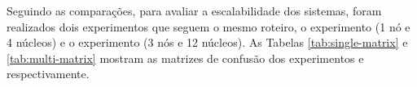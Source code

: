 




Seguindo as comparações, para avaliar a escalabilidade dos sistemas, foram
realizados dois experimentos que seguem o mesmo roteiro, o experimento \expC (1
nó e 4 núcleos) e o experimento \expD (3 nós e 12 núcleos).
As Tabelas \ref{tab:single-matrix} e \ref{tab:multi-matrix} mostram as matrizes
de confusão dos experimentos \expC e \expD respectivamente.

